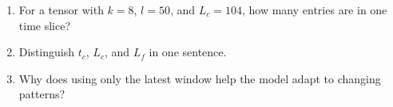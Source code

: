 \begin{selfcheck}
\begin{enumerate}
  \item For a tensor with $k=8$, $l=50$, and $L_c=104$, how many entries are in one time slice?
  \item Distinguish $t_c$, $L_c$, and $L_f$ in one sentence.
  \item Why does using only the latest window help the model adapt to changing patterns?
\end{enumerate}
\end{selfcheck}
